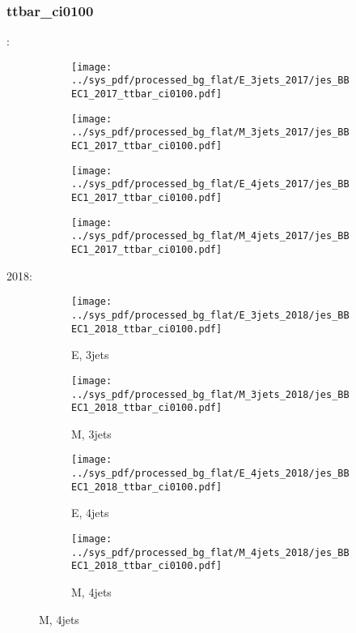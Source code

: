 \documentclass{beamer}
\begin{document}
\begin{frame}
\frametitle{ttbar_ci0100}
\fontsize{5}{1}:
\begin{figure}
\centering
\begin{subfigure}[b]{0.24\textwidth}
\texttt{[image: ../sys\_pdf/processed\_bg\_flat/E\_3jets\_2017/jes\_BBEC1\_2017\_ttbar\_ci0100.pdf]}
\end{subfigure}
\begin{subfigure}[b]{0.24\textwidth}
\texttt{[image: ../sys\_pdf/processed\_bg\_flat/M\_3jets\_2017/jes\_BBEC1\_2017\_ttbar\_ci0100.pdf]}
\end{subfigure}
\begin{subfigure}[b]{0.24\textwidth}
\texttt{[image: ../sys\_pdf/processed\_bg\_flat/E\_4jets\_2017/jes\_BBEC1\_2017\_ttbar\_ci0100.pdf]}
\end{subfigure}
\begin{subfigure}[b]{0.24\textwidth}
\texttt{[image: ../sys\_pdf/processed\_bg\_flat/M\_4jets\_2017/jes\_BBEC1\_2017\_ttbar\_ci0100.pdf]}
\end{subfigure}
\end{figure}
2018:
\begin{figure}
\centering
\begin{subfigure}[b]{0.24\textwidth}
\texttt{[image: ../sys\_pdf/processed\_bg\_flat/E\_3jets\_2018/jes\_BBEC1\_2018\_ttbar\_ci0100.pdf]}
\captionsetup{font=tiny}
\caption{E, 3jets}
\end{subfigure}
\begin{subfigure}[b]{0.24\textwidth}
\texttt{[image: ../sys\_pdf/processed\_bg\_flat/M\_3jets\_2018/jes\_BBEC1\_2018\_ttbar\_ci0100.pdf]}
\captionsetup{font=tiny}
\caption{M, 3jets}
\end{subfigure}
\begin{subfigure}[b]{0.24\textwidth}
\texttt{[image: ../sys\_pdf/processed\_bg\_flat/E\_4jets\_2018/jes\_BBEC1\_2018\_ttbar\_ci0100.pdf]}
\captionsetup{font=tiny}
\caption{E, 4jets}
\end{subfigure}
\begin{subfigure}[b]{0.24\textwidth}
\texttt{[image: ../sys\_pdf/processed\_bg\_flat/M\_4jets\_2018/jes\_BBEC1\_2018\_ttbar\_ci0100.pdf]}
\captionsetup{font=tiny}
\caption{M, 4jets}
\end{subfigure}
\end{figure}
\end{frame}
\end{document}
